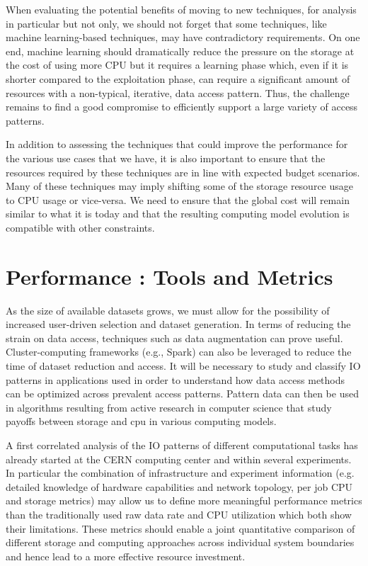 \documentclass[12pt,a4paper]{article}
\begin{document}
When evaluating the potential benefits of moving to new techniques, for
analysis in particular but not only, we should not forget that some
techniques, like machine learning-based techniques, may have
contradictory requirements. On one end, machine learning should
dramatically reduce the pressure on the storage at the cost of using
more CPU but it requires a learning phase which, even if it is shorter
compared to the exploitation phase, can require a significant amount of
resources with a non-typical, iterative, data access pattern. Thus, the
challenge remains to find a good compromise to efficiently support a
large variety of access patterns.

In addition to assessing the techniques that could improve the
performance for the various use cases that we have, it is also important
to ensure that the resources required by these techniques are in line
with expected budget scenarios. Many of these techniques may imply
shifting some of the storage resource usage to CPU usage or vice-versa.
We need to ensure that the global cost will remain similar to what it is
today and that the resulting computing model evolution is compatible
with other constraints.

\section{Performance : Tools and
Metrics}\label{performance-tools-and-metrics}

As the size of available datasets grows, we must allow for the
possibility of increased user-driven selection and dataset generation.
In terms of reducing the strain on data access, techniques such as data
augmentation can prove useful. Cluster-computing frameworks (e.g.,
Spark) can also be leveraged to reduce the time of dataset reduction and
access. It will be necessary to study and classify IO patterns in
applications used in order to understand how data access methods can be
optimized across prevalent access patterns. Pattern data can then be
used in algorithms resulting from active research in computer science
that study payoffs between storage and cpu in various computing models.

A first correlated analysis of the IO patterns of different
computational tasks has already started at the CERN computing center and
within several experiments. In particular the combination of
infrastructure and experiment information (e.g. detailed knowledge of
hardware capabilities and network topology, per job CPU and storage
metrics) may allow us to define more meaningful performance metrics than
the traditionally used raw data rate and CPU utilization which both show
their limitations. These metrics should enable a joint quantitative
comparison of different storage and computing approaches across
individual system boundaries and hence lead to a more effective resource
investment.
\end{document}
